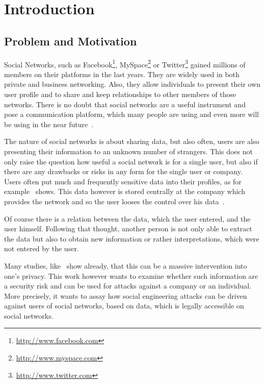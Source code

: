 \chapter{Introduction}
\label{chap:introduction}

\section{Problem and Motivation}

Social Networks, such as Facebook\footnote{\url{http://www.facebook.com}},
MySpace\footnote{\url{http://www.myspace.com}} or
Twitter\footnote{\url{http://www.twitter.com}} gained millions of members on
their platforms in the last years. They are widely used in both private and
business networking. Also, they allow individuals to present their own user
profile and to share and keep relationships to other members of those networks.
There is no doubt that social networks are a useful instrument and pose a
communication platform, which many people are using and even more will be using
in the near future~\cite{whitworth2009}.

The nature of social networks is about sharing data, but also often, users are
also presenting their information to an unknown number of strangers. This does
not only raise the question how useful a social network is for a single user,
but also if there are any drawbacks or risks in any form for the single user or
company. Users often put much and frequently sensitive data into their
profiles, as for example~\cite{brown2008} shows. This data however is stored
centrally at the company which provides the network and so the user looses the
control over his data~\cite{fraunhofer2008}.

Of course there is a relation between the data, which the user entered, and the
user himself. Following that thought, another person is not only able to
extract the data but also to obtain new information or rather interpretations,
which were not entered by the user.

Many studies, like~\cite{fraunhofer2008,gross2005} show already, that this can
be a massive intervention into one's privacy. This work however wants to
examine whether such information are a security risk and can be used for
attacks against a company or an individual. More precisely, it wants to assay
how social engineering attacks can be driven against users of social networks,
based on data, which is legally accessible on social networks.

